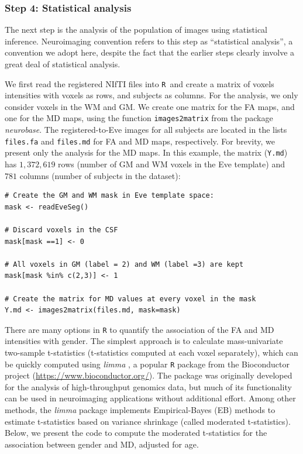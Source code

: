 \documentclass[]{elsarticle} %
\newcommand{\code}[1]{\texttt{#1}}
\newcommand{\pkg}[1]{\emph{#1}}
\newcommand{\rlang}{\texttt{R}}
\begin{document}
\subsubsection{Step 4: Statistical analysis} 
The next step is the analysis of the population of images using statistical inference. Neuroimaging convention refers to this step as ``statistical analysis'', a convention we adopt here, despite the fact that the earlier steps clearly involve a great deal of statistical analysis.

We first read the registered NIfTI files into \rlang~and create a matrix of voxels intensities with voxels as rows, and subjects as columns. For the analysis, we only consider voxels in the WM and GM. We create one matrix for the FA maps, and one for the MD maps, using the function \code{images2matrix} from the package \pkg{neurobase}. The registered-to-Eve images for all subjects are located in the lists \code{files.fa} and \code{files.md} for FA and MD maps, respectively. For brevity, we present only the analysis for the MD maps.  In this example, the matrix (\code{Y.md}) has $1,372,619$ rows (number of GM and WM voxels in the Eve template) and $781$ columns (number of subjects in the dataset):
\color{blue}
\begin{verbatim}
# Create the GM and WM mask in Eve template space:
mask <- readEveSeg()

# Discard voxels in the CSF
mask[mask ==1] <- 0 

# All voxels in GM (label = 2) and WM (label =3) are kept
mask[mask %in% c(2,3)] <- 1

# Create the matrix for MD values at every voxel in the mask
Y.md <- images2matrix(files.md, mask=mask)
\end{verbatim}
\color{black}


There are many options in {\rlang} to quantify the association of the FA and MD intensities with gender. The simplest approach is to calculate mass-univariate two-sample t-statistics (t-statistics computed at each voxel separately), which can be quickly computed using \pkg{limma} \citep{limma1,limma2, limma3}, a popular {\rlang} package from the Bioconductor project (\url{https://www.bioconductor.org/}). The package was originally developed for the analysis of high-throughput genomics data, but much of its functionality can be used in neuroimaging applications without additional effort. Among other methods, the \pkg{limma} package implements Empirical-Bayes (EB) methods to estimate t-statistics based on variance shrinkage (called moderated t-statistics). Below, we present the code to compute the moderated t-statistics for the association between gender and MD, adjusted for age. 
\end{document}
